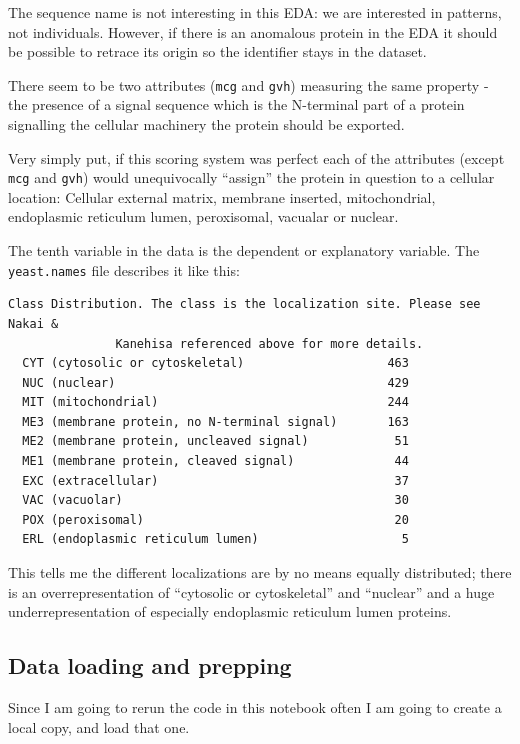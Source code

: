 \documentclass[]{book}
\begin{document}
The sequence name is not interesting in this EDA: we are interested in patterns, not individuals. However, if there is an anomalous protein in the EDA it should be possible to retrace its origin so the identifier stays in the dataset.

There seem to be two attributes (\texttt{mcg} and \texttt{gvh}) measuring the same property - the presence of a signal sequence which is the N-terminal part of a protein signalling the cellular machinery the protein should be exported.

Very simply put, if this scoring system was perfect each of the attributes (except \texttt{mcg} and \texttt{gvh}) would unequivocally ``assign'' the protein in question to a cellular location: Cellular external matrix, membrane inserted, mitochondrial, endoplasmic reticulum lumen, peroxisomal, vacualar or nuclear.

The tenth variable in the data is the dependent or explanatory variable. The \texttt{yeast.names} file describes it like this:

\begin{verbatim}
Class Distribution. The class is the localization site. Please see Nakai &
               Kanehisa referenced above for more details.
  CYT (cytosolic or cytoskeletal)                    463
  NUC (nuclear)                                      429
  MIT (mitochondrial)                                244
  ME3 (membrane protein, no N-terminal signal)       163
  ME2 (membrane protein, uncleaved signal)            51
  ME1 (membrane protein, cleaved signal)              44
  EXC (extracellular)                                 37
  VAC (vacuolar)                                      30
  POX (peroxisomal)                                   20
  ERL (endoplasmic reticulum lumen)                    5
\end{verbatim}

This tells me the different localizations are by no means equally distributed; there is an overrepresentation of ``cytosolic or cytoskeletal'' and ``nuclear'' and a huge underrepresentation of especially endoplasmic reticulum lumen proteins.

\hypertarget{data-loading-and-prepping}{%
\subsection{Data loading and prepping}\label{data-loading-and-prepping}}

Since I am going to rerun the code in this notebook often I am going to create a local copy, and load that one.
\end{document}
